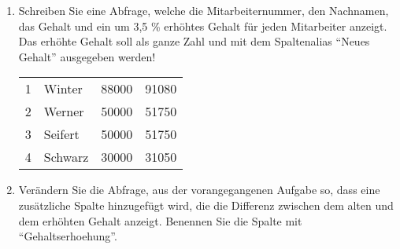 \begin{enumerate}
\begin{center}
\begin{small}
\begin{msoraclesql}
\begin{supertabular}{l}
              \end{supertabular}
            \end{msoraclesql}
          \end{small}
        \end{center}
        \item Schreiben Sie eine Abfrage, welche die Mitarbeiternummer, den
        Nachnamen, das Gehalt und ein um 3,5 \% erhöhtes Gehalt für jeden
        Mitarbeiter anzeigt. Das erhöhte Gehalt soll als ganze Zahl und mit
        dem Spaltenalias \enquote{Neues Gehalt} ausgegeben werden!
        \begin{center}
          \begin{small}
            \tablehead{}
            \begin{msoraclesql}
              \begin{supertabular}{rlrr}
                1 & Winter & 88000 & 91080 \\
                2 & Werner & 50000 & 51750 \\
                3 & Seifert & 50000 & 51750 \\
                4 & Schwarz & 30000 & 31050 \\
              \end{supertabular}
            \end{msoraclesql}
          \end{small}
        \end{center}
        \item Verändern Sie die Abfrage, aus der vorangegangenen Aufgabe so,
        dass eine zusätzliche Spalte hinzugefügt wird, die die Differenz
        zwischen dem alten und dem erhöhten Gehalt anzeigt. Benennen Sie die
        Spalte mit \enquote{Gehaltserhoehung}.
        \begin{center}

\end{center}
\end{enumerate}
